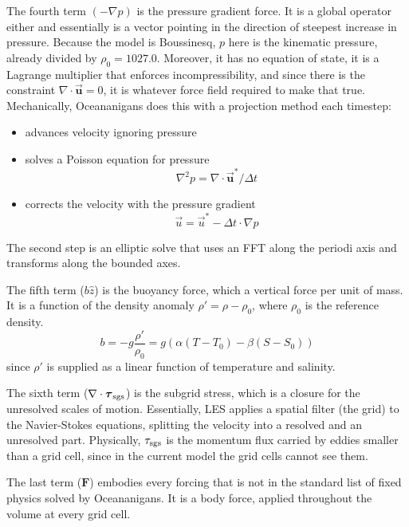 The fourth term $(-\nabla p)$ is the pressure gradient force. It is a global 
operator either and essentially is a vector
pointing in the direction of steepest increase in pressure. Because the model 
is Boussinesq, $p$ here is the kinematic pressure, already divided by $\rho_0 = 1027.0$. 
Moreover, it has no equation of state, it is a Lagrange multiplier that enforces incompressibility, 
and since there is the constraint $\nabla\cdot\mathbf{\vec{u}} = 0$, it is whatever force field 
required to make that true. Mechanically, Oceananigans does this with a projection
method each timestep:
\begin{itemize}
    \item advances velocity ignoring pressure
    \item solves a Poisson equation for pressure
    \begin{equation}
        \nabla^2 p = \nabla\cdot \mathbf{\vec{u}}^* / \Delta t
    \end{equation}
    \item corrects the velocity with the pressure gradient
    \begin{equation}
        \vec{u} = \vec{u}^* - \Delta t \cdot \nabla p
    \end{equation}
\end{itemize}
The second step is an elliptic solve that uses an FFT along the periodi axis and transforms along the bounded axes.

The fifth term ($b\hat{z}$) is the buoyancy force, which a vertical force per unit of mass. It is a function of the density anomaly $\rho' = \rho - \rho_0$, where $\rho_0$ is the reference density.
\begin{equation}
    b = -g\frac{\rho'}{\rho_0} = g\left(\alpha(T-T_0) - \beta(S-S_0)\right)
\end{equation}
since $\rho'$ is supplied as a linear function of temperature and salinity.

The sixth term ($\nabla\cdot\boldsymbol{\tau}_{\rm sgs}$) is the subgrid stress, which is a closure for the unresolved scales of motion. 
Essentially, LES applies a spatial filter (the grid) to the Navier-Stokes equations, splitting the velocity into a resolved and an unresolved part.
Physically, $\tau_{\rm sgs}$ is the momentum flux carried by eddies smaller than a grid cell, since in the current model the grid cells cannot see them. 

The last term ($\mathbf{F}$) embodies every forcing that is not in the standard list of fixed physics solved by Oceananigans.
It is a body force, applied throughout the volume at every grid cell. 

